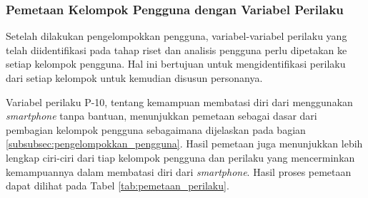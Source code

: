 \subsubsection{Pemetaan Kelompok Pengguna dengan Variabel Perilaku}
Setelah dilakukan pengelompokkan pengguna, variabel-variabel perilaku yang telah diidentifikasi pada tahap riset dan analisis pengguna perlu dipetakan ke setiap kelompok pengguna. Hal ini bertujuan untuk mengidentifikasi perilaku dari setiap kelompok untuk kemudian disusun personanya.

Variabel perilaku P-10, tentang kemampuan membatasi diri dari menggunakan \textit{smartphone} tanpa bantuan, menunjukkan pemetaan sebagai dasar dari pembagian kelompok pengguna sebagaimana dijelaskan pada bagian \ref{subsubsec:pengelompokkan_pengguna}. Hasil pemetaan juga menunjukkan lebih lengkap ciri-ciri dari tiap kelompok pengguna dan perilaku yang mencerminkan kemampuannya dalam membatasi diri dari \textit{smartphone}. Hasil proses pemetaan dapat dilihat pada Tabel \ref{tab:pemetaan_perilaku}.

